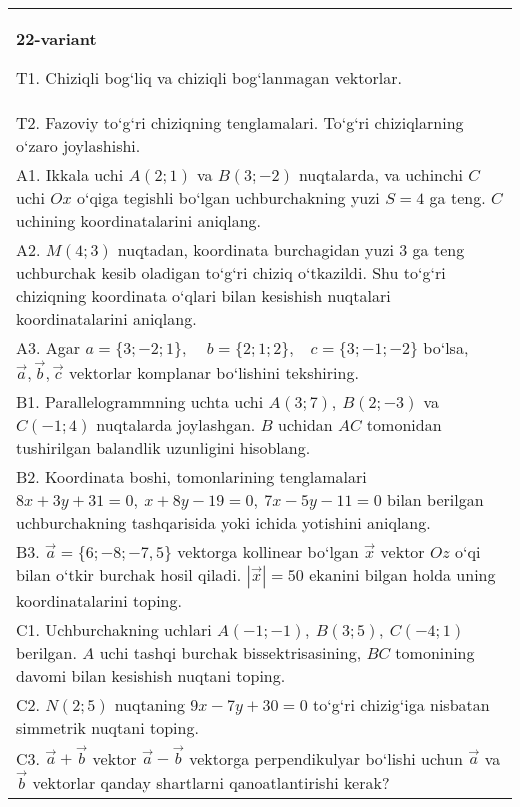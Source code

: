 \documentclass{article}
\begin{document}
\begin{tabular}{m{17cm}}
\textbf{22-variant}
\newline

T1. 
Chiziqli bog‘liq va chiziqli bog‘lanmagan vektorlar.
 \\
T2. 
Fazoviy to‘g‘ri chiziqning tenglamalari. To‘g‘ri chiziqlarning o‘zaro joylashishi.
 \\
A1. 
Ikkala uchi $A (2;1) $ va $B (3;-2) $ nuqtalarda, va
uchinchi $C$ uchi $Ox$ o‘qiga tegishli bo‘lgan uchburchakning
yuzi $S=4$ ga teng. $C$ uchining koordinatalarini aniqlang. \\
A2. 
$M (4;3) $ nuqtadan, koordinata burchagidan
yuzi 3 ga teng uchburchak kesib oladigan to‘g‘ri chiziq o‘tkazildi.
Shu to‘g‘ri chiziqning koordinata o‘qlari bilan kesishish nuqtalari
koordinatalarini aniqlang.
 \\
A3. 
Agar \(a = \{ 3; - 2;1\},\ \ \ \ \ b = \{ 2;1;2\},\ \ \ \ c = \{ 3; - 1; - 2\}\) bo‘lsa, $\overrightarrow{a}, \overrightarrow{b}, \overrightarrow{c}$ vektorlar komplanar bo‘lishini tekshiring.
 \\
B1. 
Parallelogrammning uchta uchi \(A (3;7),\ B (2;-3) \) va
\(C (-1;4) \) nuqtalarda joylashgan. $B$ uchidan $AC$
tomonidan tushirilgan balandlik uzunligini hisoblang.
 \\
B2. 
Koordinata boshi, tomonlarining tenglamalari
\(8x+3y+31=0,\ x+8y-19=0,\ 7x-5y-11=0\) bilan
berilgan uchburchakning tashqarisida yoki ichida yotishini aniqlang.
 \\
B3. 
$\vec{a} = \{ 6; - 8; - 7,5\}$ vektorga kollinear bo‘lgan $\vec{x}$ vektor $Oz$ o‘qi bilan o‘tkir burchak hosil qiladi. $|\vec{x}| = 50$ ekanini bilgan holda uning koordinatalarini toping.
 \\
C1. 
Uchburchakning uchlari
\(A (- 1; - 1),\ B (3;5),\ C (- 4;1) \) berilgan. $A$ uchi tashqi
burchak bissektrisasining, $BC$ tomonining davomi bilan kesishish
nuqtani toping.
 \\
C2. 
\(N (2; 5) \) nuqtaning \(9x - 7y + 30 = 0\) to‘g‘ri chizig‘iga
nisbatan simmetrik nuqtani toping.
 \\
C3. 
\(\vec{a} + \vec{b}\) vektor \(\vec{a} - \vec{b}\) vektorga perpendikulyar bo‘lishi uchun \(\vec{a}\) va \(\vec{b}\) vektorlar qanday shartlarni qanoatlantirishi kerak?
 \\

\end{tabular}
\vspace{1cm}
\end{document}
